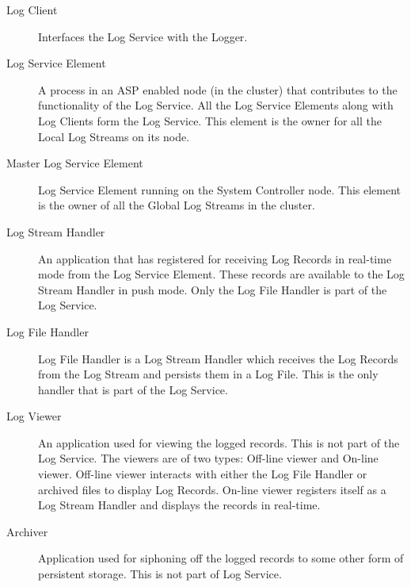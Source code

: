 \begin{flushleft}
\begin{description}
\item[Log Client] Interfaces the Log Service with the Logger. 
\end{description}


\begin{description}
\item[Log Service Element] A process in an ASP enabled node (in the cluster) that contributes to the functionality of the Log Service. All the Log 
Service Elements along with Log Clients form the Log Service. This element is the owner for all the Local Log Streams on its node.
\end{description}


\begin{description}
\item[Master Log Service Element] Log Service Element running on the System Controller node. This element is the owner of all the Global Log Streams 
in the cluster.
\end{description}

\begin{description}
\item[Log Stream Handler] An application that has registered for receiving Log Records in real-time mode from the Log Service Element. These records 
are available to the Log Stream Handler in push mode. Only the Log File Handler is part of the Log Service.
\end{description}

\begin{description}
\item[Log File Handler] Log File Handler is a Log Stream Handler which receives the Log Records from the Log Stream and persists them in a Log File. 
This is the only handler that is part of the Log Service.
\end{description}


\begin{description}
\item[Log Viewer] An application used for viewing the logged records. This is not part of the Log Service. The viewers are of two types: Off-line viewer
and On-line viewer. Off-line viewer interacts with either the Log File Handler or archived files to display Log Records. On-line viewer registers
itself as a Log Stream Handler and displays the records in real-time.
\end{description}


\begin{description}
\item[Archiver] Application used for siphoning off the logged records to some other form of persistent storage. This is not part of Log Service.
\end{description}


\end{flushleft}
